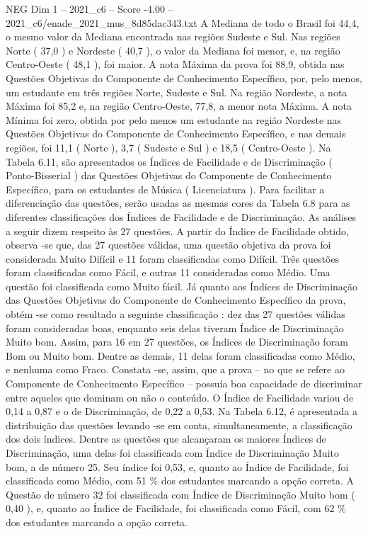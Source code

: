 \begin{textsample}{NEG Dim 1 – 2021\_c6 – Score -4.00 – 2021\_c6/enade\_2021\_mus\_8d85dac343.txt}
A Mediana de todo o Brasil foi 44,4, o mesmo valor da Mediana encontrada nas regiões Sudeste e Sul.
Nas regiões Norte ( 37,0 ) e Nordeste ( 40,7 ), o valor da Mediana foi menor, e, na região Centro-Oeste ( 48,1 ), foi maior.
A nota Máxima da prova foi 88,9, obtida nas Questões Objetivas do Componente de Conhecimento Específico, por, pelo menos, um estudante em três regiões Norte, Sudeste e Sul.
Na região Nordeste, a nota Máxima foi 85,2 e, na região Centro-Oeste, 77,8, a menor nota Máxima.
A nota Mínima foi zero, obtida por pelo menos um estudante na região Nordeste nas Questões Objetivas do Componente de Conhecimento Específico, e nas demais regiões, foi 11,1 ( Norte ), 3,7 ( Sudeste e Sul ) e 18,5 ( Centro-Oeste ).
Na Tabela 6.11, são apresentados os Índices de Facilidade e de Discriminação ( Ponto-Bisserial ) das Questões Objetivas do Componente de Conhecimento Específico, para os estudantes de Música ( Licenciatura ).
Para facilitar a diferenciação das questões, serão usadas as mesmas cores da Tabela 6.8 para as diferentes classificações dos Índices de Facilidade e de Discriminação.
As análises a seguir dizem respeito às 27 questões.
A partir do Índice de Facilidade obtido, observa -se que, das 27 questões válidas, uma questão objetiva da prova foi considerada Muito Difícil e 11 foram classificadas como Difícil.
Três questões foram classificadas como Fácil, e outras 11 consideradas como Médio.
Uma questão foi classificada como Muito fácil.
Já quanto aos Índices de Discriminação das Questões Objetivas do Componente de Conhecimento Específico da prova, obtém -se como resultado a seguinte classificação : dez das 27 questões válidas foram consideradas boas, enquanto seis delas tiveram Índice de Discriminação Muito bom.
Assim, para 16 em 27 questões, os Índices de Discriminação foram Bom ou Muito bom.
Dentre as demais, 11 delas foram classificadas como Médio, e nenhuma como Fraco.
Constata -se, assim, que a prova – no que se refere ao Componente de Conhecimento Específico – possuía boa capacidade de discriminar entre aqueles que dominam ou não o conteúdo.
O Índice de Facilidade variou de 0,14 a 0,87 e o de Discriminação, de 0,22 a 0,53.
Na Tabela 6.12, é apresentada a distribuição das questões levando -se em conta, simultaneamente, a classificação dos dois índices.
Dentre as questões que alcançaram os maiores Índices de Discriminação, uma delas foi classificada com Índice de Discriminação Muito bom, a de número 25.
Seu índice foi 0,53, e, quanto ao Índice de Facilidade, foi classificada como Médio, com 51 \% dos estudantes marcando a opção correta.
A Questão de número 32 foi classificada com Índice de Discriminação Muito bom ( 0,40 ), e, quanto ao Índice de Facilidade, foi classificada como Fácil, com 62 \% dos estudantes marcando a opção correta.

\end{textsample}
